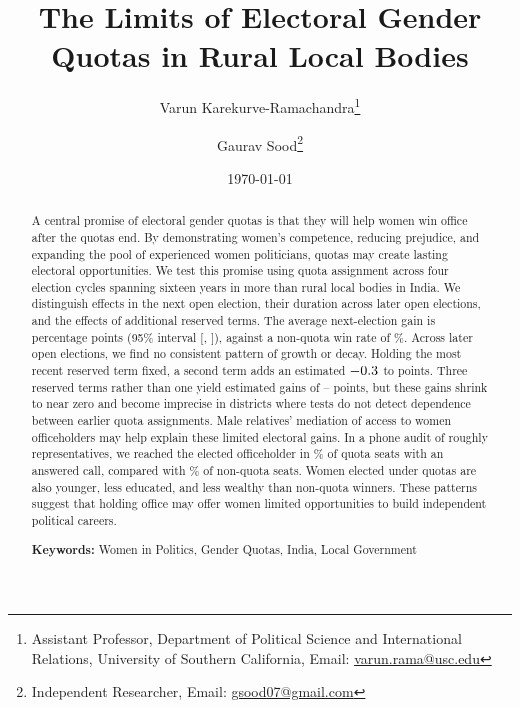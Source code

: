 \documentclass[11pt]{article}
\title{The Limits of Electoral Gender Quotas in Rural Local Bodies}
\author{Varun Karekurve-Ramachandra\thanks{Assistant Professor, Department of Political Science and International Relations, University of Southern California, Email: \href{mailto:varun.rama@usc.edu}{varun.rama@usc.edu}} \and Gaurav Sood\thanks{Independent Researcher, Email: \href{mailto:gsood07@gmail.com}{gsood07@gmail.com}}}
\date{\today}
\begin{document}
\maketitle



\begin{abstract}
\noindent A central promise of electoral gender quotas is that they will help women win office after the quotas end. By demonstrating women's competence, reducing prejudice, and expanding the pool of experienced women politicians, quotas may create lasting electoral opportunities. We test this promise using quota assignment across four election cycles spanning sixteen years in more than \abstractGpCount{} rural local bodies in India. We distinguish effects in the next open election, their duration across later open elections, and the effects of additional reserved terms. The average next-election gain is \poolEstimate{} percentage points (95\% interval [\poolLow{}, \poolHigh{}]), against a non-quota win rate of \poolControl{}\%. Across later open elections, we find no consistent pattern of growth or decay. Holding the most recent reserved term fixed, a second term adds an estimated $-0.3{}$ to \twoTermExtraMax{} points. Three reserved terms rather than one yield estimated gains of \upFullExtra{}--\rajFullExtra{} points, but these gains shrink to near zero and become imprecise in districts where tests do not detect dependence between earlier quota assignments. Male relatives' mediation of access to women officeholders may help explain these limited electoral gains. In a phone audit of roughly \abstractPhoneN{} representatives, we reached the elected officeholder in \phoneQuotaMemberWhole{}\% of quota seats with an answered call, compared with \phoneOpenMemberWhole{}\% of non-quota seats. Women elected under quotas are also younger, less educated, and less wealthy than non-quota winners. These patterns suggest that holding office may offer women limited opportunities to build independent political careers.

\vspace{6mm}

\noindent \textbf{Keywords:} Women in Politics, Gender Quotas, India, Local Government

\end{abstract}

\thispagestyle{empty}

\newpage
\FloatBarrier

\end{document}
